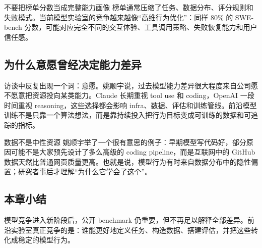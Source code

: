 \begin{warningbox}{不要把榜单分数当成完整能力画像}
榜单通常压缩了任务、数据分布、评分规则和失败模式。当前模型实验室的竞争越来越像“高维行为优化”：同样 80\% 的 SWE-bench 分数，可能对应完全不同的交互体验、工具调用策略、失败恢复能力和用户信任感。
\end{warningbox}

\subsection{为什么意愿曾经决定能力差异}

访谈中反复出现一个词：意愿。姚顺宇说，过去模型能力差异很大程度来自公司愿不愿意把资源投向某类能力。Claude 长期重视 tool use 和 coding，OpenAI 一段时间重视 reasoning，这些选择都会影响 infra、数据、评估和训练管线。前沿模型训练不是只靠一个算法想法，而是靠持续投入把行为目标变成可训练的数据和可追踪的指标。

\begin{knowledgebox}{数据不是中性资源}
姚顺宇举了一个很有意思的例子：早期模型写代码好，部分原因可能不是大家预先设计了多么高级的 coding pipeline，而是互联网中的 GitHub 数据天然比普通网页质量更高。也就是说，模型行为有时来自数据分布中的隐性偏置；研究者事后才理解“为什么它学会了这个”。
\end{knowledgebox}

\subsection{本章小结}

模型竞争进入新阶段后，公开 benchmark 仍重要，但不再足以解释全部差异。前沿实验室真正竞争的是：谁能更好地定义任务、构造数据、搭建评估，并把这些转化成稳定的模型行为。


